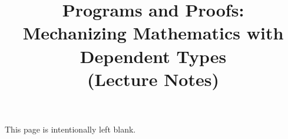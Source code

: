 \documentclass[12pt]{report}
\title{Programs and Proofs:\\
Mechanizing Mathematics with Dependent Types 
\\
(Lecture Notes)
}
\author{}
\begin{document}
\maketitle

\thispagestyle{empty}
\mbox{}\vfill

\begin{center}

This page is intentionally left blank.

\end{center}

\clearpage
{}
{}
\tableofcontents









\clearpage
{}
{}



\end{document}

